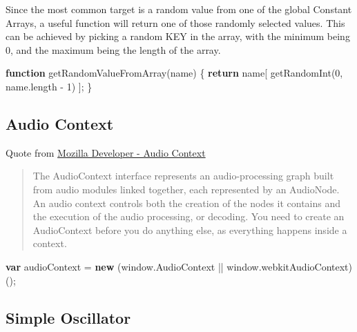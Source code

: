 \documentclass[]{article}
\newenvironment{Shaded}{}{}
\newcommand{\KeywordTok}[1]{\textbf{#1}}
\newcommand{\DecValTok}[1]{#1}
\newcommand{\VariableTok}[1]{#1}
\newcommand{\ControlFlowTok}[1]{\textbf{#1}}
\newcommand{\OperatorTok}[1]{#1}
\newcommand{\AttributeTok}[1]{#1}
\newcommand{\NormalTok}[1]{#1}
\begin{document}
Since the most common target is a random value from one of the global
Constant Arrays, a useful function will return one of those randomly
selected values. This can be achieved by picking a random KEY in the
array, with the minimum being 0, and the maximum being the length of the
array.

\begin{Shaded}
\begin{Highlighting}[]
\KeywordTok{function} \AttributeTok{getRandomValueFromArray}\NormalTok{(name) }\OperatorTok{\{}
    \ControlFlowTok{return}\NormalTok{ name[ }\AttributeTok{getRandomInt}\NormalTok{(}\DecValTok{0}\OperatorTok{,} \VariableTok{name}\NormalTok{.}\AttributeTok{length} \OperatorTok{-} \DecValTok{1}\NormalTok{) ]}\OperatorTok{;}
\OperatorTok{\}}
\end{Highlighting}
\end{Shaded}

\subsection{Audio Context}\label{audio-context}

Quote from
\href{https://developer.mozilla.org/en-US/docs/Web/API/AudioContext}{Mozilla
Developer - Audio Context}

\begin{quote}
The AudioContext interface represents an audio-processing graph built
from audio modules linked together, each represented by an AudioNode. An
audio context controls both the creation of the nodes it contains and
the execution of the audio processing, or decoding. You need to create
an AudioContext before you do anything else, as everything happens
inside a context.
\end{quote}

\begin{Shaded}
\begin{Highlighting}[]
\KeywordTok{var}\NormalTok{ audioContext }\OperatorTok{=} \KeywordTok{new}\NormalTok{ (}\VariableTok{window}\NormalTok{.}\AttributeTok{AudioContext} \OperatorTok{||} \VariableTok{window}\NormalTok{.}\AttributeTok{webkitAudioContext}\NormalTok{)()}\OperatorTok{;}
\end{Highlighting}
\end{Shaded}

\subsection{Simple Oscillator}\label{simple-oscillator}
\end{document}

